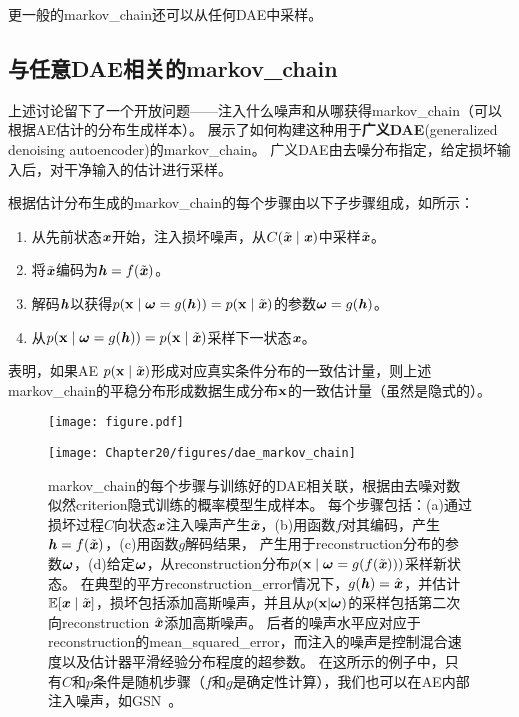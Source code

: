 更一般的\gls{markov_chain}还可以从任何\gls{DAE}中采样。


\subsection{与任意\gls{DAE}相关的\gls{markov_chain}}
\label{sec:markov_chain_associated_with_any_denoising_autoencoder}

上述讨论留下了一个开放问题——注入什么噪声和从哪获得\gls{markov_chain}（可以根据\gls{AE}估计的分布生成样本）。
\citet{Bengio-et-al-NIPS2013-small}展示了如何构建这种用于\textbf{广义\gls{DAE}}(generalized denoising autoencoder)的\gls{markov_chain}。
广义\gls{DAE}由去噪分布指定，给定损坏输入后，对干净输入的估计进行采样。

根据估计分布生成的\gls{markov_chain}的每个步骤由以下子步骤组成，如所示：
\begin{enumerate}
 \item 从先前状态$\boldsymbol{\mathit{x}}$开始，注入损坏噪声，从$C(\tilde{\boldsymbol{\mathit{x}}}  \mid  \boldsymbol{\mathit{x}})$中采样$\tilde{\boldsymbol{\mathit{x}}}$。
 \item 将$\tilde{\boldsymbol{\mathit{x}}}$编码为$\boldsymbol{\mathit{h}} = f(\tilde{\boldsymbol{\mathit{x}}})$。
 \item 解码$\boldsymbol{\mathit{h}}$以获得$p(\mathbf{x}  \mid  \boldsymbol{\omega} = g(\boldsymbol{\mathit{h}})) = p(\mathbf{x}  \mid  \tilde{\boldsymbol{\mathit{x}}})$的参数$\boldsymbol{\omega} = g(\boldsymbol{\mathit{h}})$。
 \item 从$p(\mathbf{x}  \mid  \boldsymbol{\omega} = g(\boldsymbol{\mathit{h}})) = p(\mathbf{x}  \mid  \tilde{\boldsymbol{\mathit{x}}})$采样下一状态$\boldsymbol{\mathit{x}}$。
\end{enumerate}
\citet{Bengio-et-al-ICML-2014} 表明，如果\gls{AE} $p(\mathbf{x}  \mid  \tilde{\boldsymbol{\mathit{x}}})$形成对应真实条件分布的一致估计量，则上述\gls{markov_chain}的平稳分布形成数据生成分布$\mathbf{x}$的一致估计量（虽然是隐式的）。

\begin{figure}[!htb]
\ifOpenSource
\centerline{\texttt{[image: figure.pdf]}}
\else
\centerline{\texttt{[image: Chapter20/figures/dae\_markov\_chain]}}
\fi
\caption{\gls{markov_chain}的每个步骤与训练好的\gls{DAE}相关联，根据由去噪对数似然\gls{criterion}隐式训练的概率模型生成样本。
每个步骤包括：(a)通过损坏过程$C$向状态$\boldsymbol{\mathit{x}}$注入噪声产生$\tilde{\boldsymbol{\mathit{x}}}$，(b)用函数$f$对其编码，产生$\boldsymbol{\mathit{h}} = f(\tilde{\boldsymbol{\mathit{x}}})$，(c)用函数$g$解码结果， 产生用于\gls{reconstruction}分布的参数$\boldsymbol{\omega}$，(d)给定$\boldsymbol{\omega}$，从\gls{reconstruction}分布$p(\mathbf{x} \mid \boldsymbol{\omega} = g(f(\tilde{\boldsymbol{\mathit{x}}})))$采样新状态。
在典型的平方\gls{reconstruction_error}情况下，$g(\boldsymbol{\mathit{h}}) = \hat{\boldsymbol{\mathit{x}}}$，并估计$\mathbb{E} [ \boldsymbol{\mathit{x}} \mid \tilde{\boldsymbol{\mathit{x}}}]$，损坏包括添加高斯噪声，并且从$p(\mathbf{x} | \boldsymbol{\omega})$的采样包括第二次向\gls{reconstruction} $\hat{\boldsymbol{\mathit{x}}}$添加高斯噪声。
后者的噪声水平应对应于\gls{reconstruction}的\gls{mean_squared_error}，而注入的噪声是控制混合速度以及估计器平滑经验分布程度的超参数\citep{Vincent-NC-2011-small}。
在这所示的例子中，只有$C$和$p$条件是随机步骤（$f$和$g$是确定性计算），我们也可以在\gls{AE}内部注入噪声，如\gls{GSN}~\citep{Bengio-et-al-ICML-2014}。
}
\label{fig:chap20_dae_markov_chain}
\end{figure}

